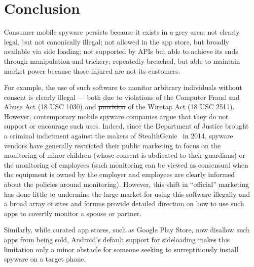 \documentclass[sigconf,balance=false]{acmart}
\providecommand{\DIFadd}[1]{{\protect\color{blue}\uwave{#1}}} %
\providecommand{\DIFdel}[1]{{\protect\color{red}\sout{#1}}}                      %
\providecommand{\DIFaddbegin}{} %
\providecommand{\DIFaddend}{} %
\providecommand{\DIFdelbegin}{} %
\providecommand{\DIFdelend}{} %
\newcommand{\DIFscaledelfig}{0.5}
\newlength{\DIFdelgraphicswidth} %
\newlength{\DIFdelgraphicsheight} %
\newcommand{\DIFaddincludegraphics}[2][]{{\color{blue}\fbox{\DIFOincludegraphics[#1]{#2}}}} %
\newcommand{\DIFdelincludegraphics}[2][]{%
\sbox{\DIFdelgraphicsbox}{\DIFOincludegraphics[#1]{#2}}%
\settoboxwidth{\DIFdelgraphicswidth}{\DIFdelgraphicsbox} %
\settoboxtotalheight{\DIFdelgraphicsheight}{\DIFdelgraphicsbox} %
\scalebox{\DIFscaledelfig}{%
\parbox[b]{\DIFdelgraphicswidth}{\usebox{\DIFdelgraphicsbox}\\[-\baselineskip] \rule{\DIFdelgraphicswidth}{0em}}\llap{\resizebox{\DIFdelgraphicswidth}{\DIFdelgraphicsheight}{%
\setlength{\unitlength}{\DIFdelgraphicswidth}%
\begin{picture}(1,1)%
\thicklines\linethickness{2pt} %
{\color[rgb]{1,0,0}\put(0,0){\framebox(1,1){}}}%
{\color[rgb]{1,0,0}\put(0,0){\line( 1,1){1}}}%
{\color[rgb]{1,0,0}\put(0,1){\line(1,-1){1}}}%
\end{picture}%
}\hspace*{3pt}}} %
} %
\DeclareRobustCommand{\DIFaddbegin}{\DIFOaddbegin \let\includegraphics\DIFaddincludegraphics} %
\DeclareRobustCommand{\DIFaddend}{\DIFOaddend \let\includegraphics\DIFOincludegraphics} %
\DeclareRobustCommand{\DIFdelbegin}{\DIFOdelbegin \let\includegraphics\DIFdelincludegraphics} %
\DeclareRobustCommand{\DIFdelend}{\DIFOaddend \let\includegraphics\DIFOincludegraphics} %
\begin{document}

\section{Conclusion}
Consumer mobile spyware persists because it exists in a grey area: not
clearly legal, but not canonically illegal; not allowed in the app
store, but broadly available via side loading; not supported by APIs
but able to achieve its ends through manipulation and trickery;
repeatedly breached, but able to maintain market power because those
injured are not its customers.

For example, the use of such software to monitor arbitrary individuals
without consent is clearly illegal --- both due to violations of the
Computer Fraud and Abuse Act (18 USC 1030) and \DIFdelbegin \DIFdel{provision }\DIFdelend \DIFaddbegin \DIFadd{provisions }\DIFaddend of the
Wiretap Act (18 USC 2511).  However, contemporary mobile spyware
companies argue that they do not support or encourage such uses.
Indeed, since the Department of Justice brought a criminal indictment
against the makers of StealthGenie~\cite{dojstealthgenie} in 2014,
spyware vendors have generally restricted their public marketing to
focus on the monitoring of minor children (whose consent is abdicated
to their guardians) or the monitoring of employees (such monitoring
can be viewed as consensual when the equipment is owned by the
employer and employees are clearly informed about the policies around
monitoring).  However, this shift in ``official'' marketing has done
little to undermine the large market for using this software illegally
and a broad array of sites and forums provide detailed direction on
how to use such apps to covertly monitor a spouse or partner.

Similarly, while curated app stores, such as Google Play Store, now
disallow such apps from being sold, Android's default support for
sideloading makes this limitation only a minor obstacle for someone
seeking to surreptitiously install spyware on a target phone.
\end{document}
